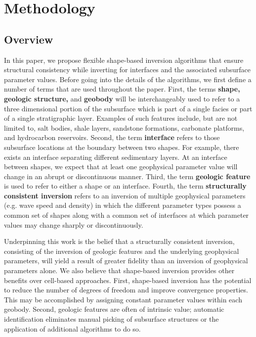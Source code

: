 \documentclass[manuscript,revised]{geophysics}
\begin{document}
\section{Methodology}

\subsection{Overview}
In this paper, we propose flexible shape-based inversion algorithms that ensure structural consistency while inverting for interfaces and the associated subsurface parameter values.  Before going into the details of the algorithms, we first define a number of terms that are used throughout the paper.  First, the terms \textbf{shape, geologic structure,} and \textbf{geobody} will be interchangeably used to refer to a three dimensional portion of the subsurface which is part of a single facies or part of a single stratigraphic layer.  Examples of such features include, but are not limited to, salt bodies, shale layers, sandstone formations, carbonate platforms, and hydrocarbon reservoirs.  Second, the term \textbf{interface} refers to those subsurface locations at the boundary between two shapes.  For example, there exists an interface separating different sedimentary layers.  At an interface between shapes, we expect that at least one geophysical parameter value will change in an abrupt or discontinuous manner.  Third, the term \textbf{geologic feature} is used to refer to either a shape or an interface.  Fourth, the term \textbf{structurally consistent inversion} refers to an inversion of multiple geophysical parameters (e.g. wave speed and density) in which the different parameter types possess a common set of shapes along with a common set of interfaces at which parameter values may change sharply or discontinuously. 

Underpinning this work is the belief that a structurally consistent inversion, consisting of the inversion of geologic features and the underlying geophysical parameters, will yield a result of greater fidelity than an inversion of geophysical parameters alone.  We also believe that shape-based inversion provides other benefits over cell-based approaches.  First, shape-based inversion has the potential to reduce the number of degrees of freedom and improve convergence properties.  This may be accomplished by assigning constant parameter values within each geobody.   Second, geologic features are often of intrinsic value; automatic identification eliminates manual 
picking of subsurface structures or the application of additional algorithms to do so.
\end{document}

